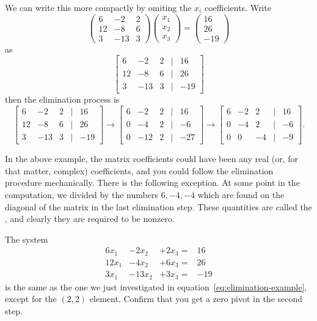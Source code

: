 We can write this more compactly by omiting the $x_i$ coefficients. Write
\[ 
\begin{pmatrix}
  6&-2&2\\ 12&-8&6\\ 3&-13&3
\end{pmatrix}
\begin{pmatrix} x_1\\ x_2\\ x_3 \end{pmatrix}
=
\begin{pmatrix}
  16\\ 26\\ -19
\end{pmatrix}
\]
as
\begin{equation}
\left[
  \begin{matrix}
    6&-2&2&|&16\\ 12&-8&6&|&26\\ 3&-13&3&|&-19      
  \end{matrix}\right]
\label{eq:systemabbrev}\end{equation}
then the elimination process is
\[
\left[
  \begin{matrix}
    6&-2&2&|&16\\ 12&-8&6&|&26\\ 3&-13&3&|&-19      
  \end{matrix}\right] \longrightarrow
\left[
    \begin{matrix}
      6&-2&2&|&16\\ 0&-4&2&|&-6\\ 0&-12&2&|&-27
    \end{matrix}\right] \longrightarrow
  \left[
    \begin{matrix}
      6&-2&2&|&16\\ 0&-4&2&|&-6\\ 0&0&-4&|&-9
    \end{matrix}\right].
  \]

In the above example, the matrix coefficients could have been any real
(or, for that matter, complex) coefficients, and you could follow the
elimination procedure mechanically.
There is  the following exception.
At some point in the computation, we divided by the numbers
$6,-4,-4$ which are found on the diagonal of the matrix in the last
elimination step. These quantities are called the ,
and clearly they are required to be nonzero. 

\begin{exercise}
  \label{ex:zero-pivot}
  The system 
  \[
  \begin{array}{rrrr}
    6x_1&-2x_2&+2x_3=&16 \\ 12x_1&-4x_2&+6x_3=&26 \\ 3x_1&-13x_2&+3x_3=&-19
  \end{array}
  \]
  is the same as the one we just investigated in
  equation~\eqref{eq:elimination-example}, except for the $(2,2)$
  element. Confirm that you get a zero pivot in the second step.
\end{exercise}


